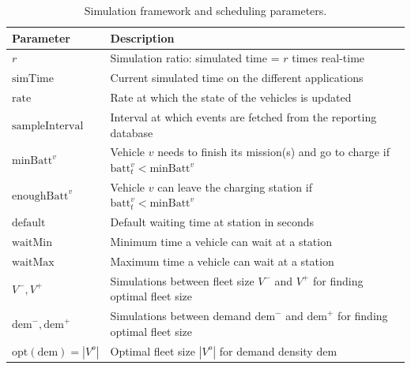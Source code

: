 \documentclass[12pt,a4paper]{article}
\begin{document}
\begin{itemize}

\end{itemize}

\begin{table}

  \centering
\begin{tabularx}{\linewidth}{| l | Y |} 
  \hline			
 Parameter & Description \\
\hline	  
  $r$ & Simulation ratio: simulated time = $r$ times real-time\\
  $\text{simTime}$ & Current simulated time on the different applications \\
  $\text{rate}$ & Rate at which the state of the vehicles is updated \\
  $\text{sampleInterval}$ & Interval at which events are fetched from the reporting database \\
  $\text{minBatt}^{v}$ & Vehicle $v$ needs to finish its mission(s) and go to charge if $\text{batt}^{v}_{t} < \text{minBatt}^{v}$\\
  $\text{enoughBatt}^{v} $& Vehicle $v$ can leave the charging station if $\text{batt}^{v}_{t} < \text{minBatt}^{v}$\\
  $\text{default}$ & Default waiting time at station in seconds\\
    $\text{waitMin}$ & Minimum time a vehicle can wait at a station\\
  $\text{waitMax}$ & Maximum time a vehicle can wait at a station\\
  $V^{-}, V^{+}$ & Simulations between fleet size $V^{-}$ and $V^{+}$ for finding optimal fleet size \\
    $\text{dem}^{-}, \text{dem}^{+}$ & Simulations between demand $\text{dem}^{-}$ and $\text{dem}^{+}$ for finding optimal fleet size \\
    $\text{opt}(\text{dem}) = | V^{o}|$ & Optimal fleet size $|V^{o}|$ for demand density $\text{dem}$ \\
  
  \hline  
\end{tabularx}

\caption{Simulation framework and scheduling parameters.}
\label{table:simparameters}
\end{table}
\end{document}
